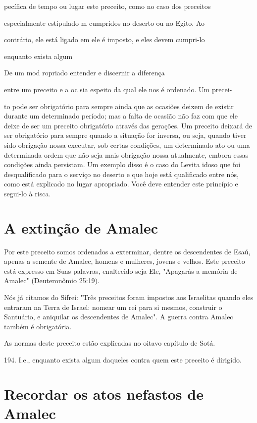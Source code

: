 pecífica de tempo ou lugar este preceito, como no caso dos preceitos

especialmente estipulado m cumpridos no deserto ou no Egito. Ao

contrário, ele está ligado em ele é imposto, e eles devem cumpri-lo

enquanto exista algum

De um mod ropriado entender e discernir a diferença

entre um preceito e a oc sia espeito da qual ele nos é ordenado. Um
precei-

to pode ser obrigatório para sempre ainda que as ocasiões deixem de
existir durante um determinado período; mas a falta de ocasião não faz
com que ele deixe de ser um preceito obrigatório através das gerações.
Um preceito deixará de ser obrigatório para sempre quando a situação for
inversa, ou seja, quando tiver sido obrigação nossa executar, sob certas
condições, um determinado ato ou uma determinada ordem que não seja mais
obrigação nossa atualmente, em­bora essas condições ainda persistam. Um
exemplo disso é o caso do Levita idoso que foi desqualificado para o
serviço no deserto e que hoje está qualifica­do entre nós, como está
explicado no lugar apropriado. Você deve entender este princípio e
segui-lo à risca.

\section{A extinção de Amalec}

Por este preceito somos ordenados a exterminar, dentre os descen­dentes
de Esaú, apenas a semente de Amalec, homens e mulheres, jovens e
ve­lhos. Este preceito está expresso em Suas palavras, enaltecido seja
Ele, "Apaga­rás a memória de Amalec" (Deuteronômio 25:19).

Nós já citamos do Sifrei: "Três preceitos foram impostos aos Israeli­tas
quando eles entraram na Terra de Israel: nomear um rei para si mesmos,
construir o Santuário, e aniquilar os descendentes de Amalec". A guerra
contra Amalec também é obrigatória.


As normas deste preceito estão explicadas no oitavo capítulo de Sotá.


194. I.e., enquanto exista algum daqueles contra quem este preceito é
dirigido.



\section{Recordar os atos nefastos de Amalec}


